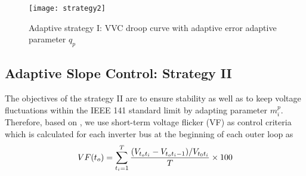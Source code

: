 \documentclass[journal]{IEEEtran}
\newcommand{\squeezeup}{\vspace{-2.5mm}}
\begin{document}
\begin{figure}
	\centering
	\texttt{[image: strategy2]}
    \caption {Adaptive strategy I: VVC droop curve with adaptive error adaptive parameter $q_p$ }
    \label{fig:strategy2}
    \squeezeup
\end{figure}

\subsection{Adaptive Slope Control: Strategy II}
The objectives of the strategy II are to ensure stability as well as to keep voltage fluctuations within the IEEE 141 standard\cite{ieee_141_1994} limit by adapting parameter $m^p_i$. Therefore, based on \cite{ieee_141_1994}, we use short-term voltage flicker (VF) as control criteria which is calculated for each inverter bus at the beginning of each outer loop as
\setlength\abovedisplayskip{2pt}
\setlength\belowdisplayskip{2pt}
\begin{equation}
\small
\label{eq:vf}
VF(t_o)=\sum_{t_i=1}^{T}\frac{(V_{t_ot_i}- V_{t_ot_i-1})/ V_{t_0t_i}}{T}\times 100
\end{equation}
\end{document}
